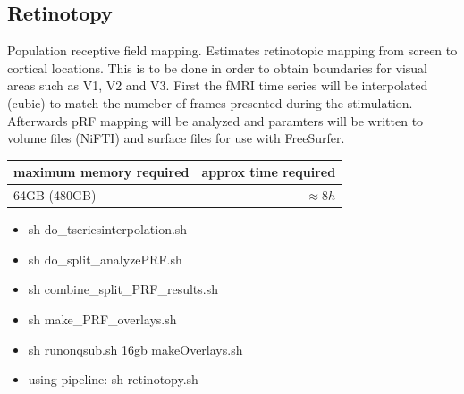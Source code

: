 \documentclass[12pt,a4paper]{scrartcl}
\begin{document}
\subsection{Retinotopy}
Population receptive field mapping. Estimates retinotopic mapping from screen to cortical locations. This is to be done in order to obtain boundaries for visual areas such as V1, V2 and V3. First the fMRI time series will be interpolated (cubic) to match the numeber of frames presented during the stimulation. Afterwards pRF mapping will be analyzed and paramters will be written to volume files (NiFTI) and surface files for use with FreeSurfer.
\begin{table}[h]
\begin{tabular}{l | r}
\toprule
maximum memory required & approx time required\\\toprule
64GB (480GB) & $\approx 8h$ \\\bottomrule
\end{tabular}
\end{table}
\begin{itemize}
\item sh do\_tseriesinterpolation.sh
\item sh do\_split\_analyzePRF.sh
\item sh combine\_split\_PRF\_results.sh
\item sh make\_PRF\_overlays.sh
\item sh runonqsub.sh 16gb makeOverlays.sh
\item using pipeline: sh retinotopy.sh
\end{itemize}
\end{document}
